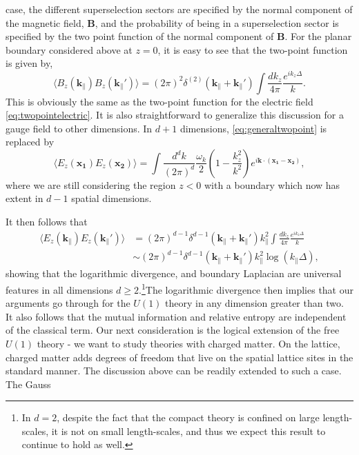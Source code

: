 case, the different superselection sectors are specified by the normal
component of the magnetic field, \textbf{B},  and the probability of being
in a superselection sector is specified by the two point function of the normal
component of \textbf{B}. For the planar boundary considered above at $z=0$, it
is easy to see that the two-point function is given by,
\begin{equation}
  \langle B_z(\mathbf{k}_{\|})B_z(\mathbf{k}_{\|}')\rangle
  = (2\pi)^2\delta^{(2)}(\mathbf{k}_{\|}+\mathbf{k}_{\|}')\int\frac{dk_z}{4\pi}\frac{e^{ik_z\Delta}}{k}.
\end{equation}
This is obviously the same as the two-point function for the electric field
\eqref{eq:twopointelectric}.
It is also straightforward to generalize this discussion for a gauge field to 
other dimensions. In $d+1$ dimensions, \eqref{eq:generaltwopoint} is replaced
by
\begin{equation}
  \langle E_z(\mathbf{x_1})E_z(\mathbf{x_2})\rangle = \int
  \frac{d^dk}{(2\pi)^d}\frac{\omega_k}{2}\left(1-\frac{k^2_z}{k^2}\right)e^{i\mathbf{k}\cdot(\mathbf{x_1}-\mathbf{x_2})},
\end{equation}
where we are still considering the region $z<0$ with a boundary which now has
extent in $d-1$ spatial dimensions.
\par It then follows that
\begin{align}
  \langle E_z(\mathbf{k}_{\|})E_z(\mathbf{k}_{\|}')\rangle
  &=(2\pi)^{d-1}\delta^{d-1}(\mathbf{k}_{\|}+\mathbf{k}_{\|}')k^2_{\|}\int
  \frac{dk_z}{4\pi}\frac{e^{ik_z\Delta}}{k}\nonumber\\
  &\sim (2\pi)^{d-1}\delta^{d-1}(\mathbf{k}_{\|}+\mathbf{k}_{\|}')k^2_{\|}\log(k_{\|}\Delta),
\end{align}
showing that the logarithmic divergence, and boundary Laplacian are universal
features in all dimensions $d\geq 2$.\footnote{In $d=2$, despite the fact that
  the compact theory is confined on large length-scales, it is not on small
length-scales, and thus we expect this result to continue to hold as well.}The
logarithmic divergence then implies that our arguments go through for the
$U(1)$ theory in any dimension greater than two. It also follows that the
mutual information and relative entropy are independent of the classical
term.
Our next consideration is the logical extension of the free $U(1)$ theory - we
want to study theories with charged matter. On the lattice, charged matter adds
degrees of freedom that live on the spatial lattice sites in the standard
manner. The discussion above can be readily extended to such a case. The Gauss

